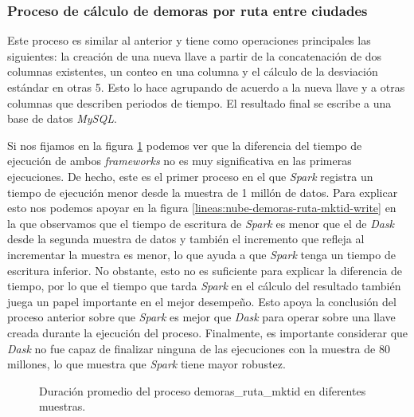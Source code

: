 \subsubsection{Proceso de cálculo de demoras por ruta entre ciudades}

Este proceso es similar al anterior y tiene como operaciones principales las siguientes: la creación de una nueva llave a partir de la concatenación de dos columnas existentes, un conteo en una columna y el cálculo de la desviación estándar en otras 5. Esto lo hace agrupando de acuerdo a la nueva llave y a otras columnas que describen periodos de tiempo. El resultado final se escribe a una base de datos \textit{MySQL}.

Si nos fijamos en la figura \ref{lineas:nube-demoras-ruta-mktid} podemos ver que la diferencia del tiempo de ejecución de ambos \textit{frameworks} no es muy significativa en las primeras ejecuciones. De hecho, este es el primer proceso en el que \textit{Spark} registra un tiempo de ejecución menor desde la muestra de 1 millón de datos. Para explicar esto nos podemos apoyar en la figura \ref{lineas:nube-demoras-ruta-mktid-write} en la que observamos que el tiempo de escritura de \textit{Spark} es menor que el de \textit{Dask} desde la segunda muestra de datos y también el incremento que refleja al incrementar la muestra es menor, lo que ayuda a que \textit{Spark} tenga un tiempo de escritura inferior. No obstante, esto no es suficiente para explicar la diferencia de tiempo, por lo que el tiempo que tarda \textit{Spark} en el cálculo del resultado también juega un papel importante en el mejor desempeño. Esto apoya la conclusión del proceso anterior sobre que \textit{Spark} es mejor que \textit{Dask} para operar sobre una llave creada durante la ejecución del proceso. Finalmente, es importante considerar que \textit{Dask} no fue capaz de finalizar ninguna de las ejecuciones con la muestra de 80 millones, lo que muestra que \textit{Spark} tiene mayor robustez.


\begin{figure}
\centering
{}
\caption{Duración promedio del proceso demoras\_ruta\_mktid en diferentes muestras.}
\label{lineas:nube-demoras-ruta-mktid}
\end{figure}


